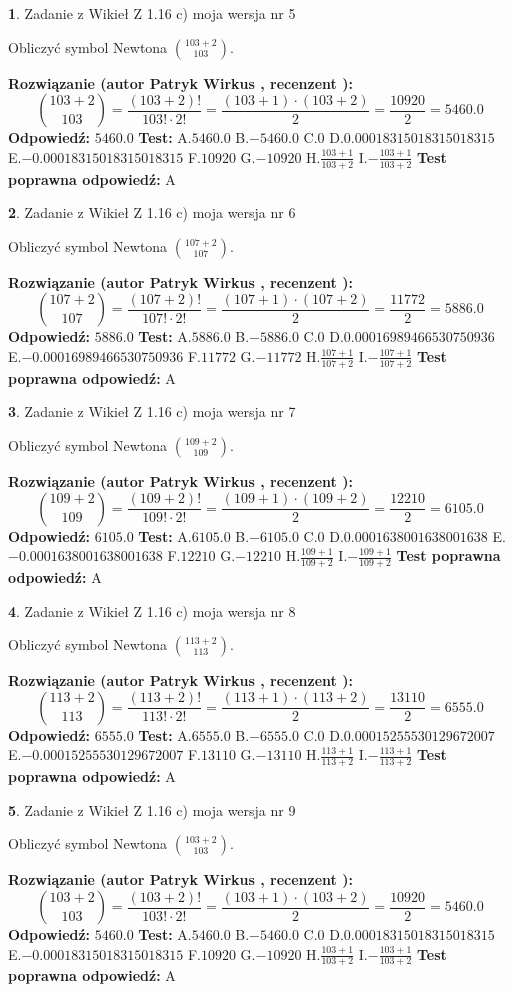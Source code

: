 \documentclass[12pt, a4paper]{article}
\theoremstyle{definition} %
\newtheorem{zad}{}
\newcommand{\zadStart}[1]{\begin{zad}#1\newline}
\newcommand{\zadStop}{\end{zad}}
\newcommand{\rozwStart}[2]{\noindent \textbf{Rozwiązanie (autor #1 , recenzent #2): }\newline}
\newcommand{\rozwStop}{\newline}
\newcommand{\odpStart}{\noindent \textbf{Odpowiedź:}\newline}
\newcommand{\odpStop}{\newline}
\newcommand{\testStart}{\noindent \textbf{Test:}\newline}
\newcommand{\testStop}{\newline}
\newcommand{\kluczStart}{\noindent \textbf{Test poprawna odpowiedź:}\newline}
\newcommand{\kluczStop}{\newline}
\begin{document}
\zadStart{Zadanie z Wikieł Z 1.16 c) moja wersja nr 5}

Obliczyć symbol Newtona ${103+2 \choose 103}$.
\zadStop
\rozwStart{Patryk Wirkus}{}
$${103+2 \choose 103} = \frac{(103+2)!}{103! \cdot 2!} = \frac{(103+1)\cdot(103+2)}{2} = \frac{10920}{2} = 5460.0$$
\rozwStop
\odpStart
$5460.0$
\odpStop
\testStart
A.$5460.0$ B.$-5460.0$ C.$0$ D.$0.00018315018315018315$ E.$-0.00018315018315018315$
F.$10920$ G.$-10920$
H.$\frac{103+1}{103+2}$
I.$-\frac{103+1}{103+2}$
\testStop
\kluczStart
A
\kluczStop



\zadStart{Zadanie z Wikieł Z 1.16 c) moja wersja nr 6}

Obliczyć symbol Newtona ${107+2 \choose 107}$.
\zadStop
\rozwStart{Patryk Wirkus}{}
$${107+2 \choose 107} = \frac{(107+2)!}{107! \cdot 2!} = \frac{(107+1)\cdot(107+2)}{2} = \frac{11772}{2} = 5886.0$$
\rozwStop
\odpStart
$5886.0$
\odpStop
\testStart
A.$5886.0$ B.$-5886.0$ C.$0$ D.$0.00016989466530750936$ E.$-0.00016989466530750936$
F.$11772$ G.$-11772$
H.$\frac{107+1}{107+2}$
I.$-\frac{107+1}{107+2}$
\testStop
\kluczStart
A
\kluczStop



\zadStart{Zadanie z Wikieł Z 1.16 c) moja wersja nr 7}

Obliczyć symbol Newtona ${109+2 \choose 109}$.
\zadStop
\rozwStart{Patryk Wirkus}{}
$${109+2 \choose 109} = \frac{(109+2)!}{109! \cdot 2!} = \frac{(109+1)\cdot(109+2)}{2} = \frac{12210}{2} = 6105.0$$
\rozwStop
\odpStart
$6105.0$
\odpStop
\testStart
A.$6105.0$ B.$-6105.0$ C.$0$ D.$0.0001638001638001638$ E.$-0.0001638001638001638$
F.$12210$ G.$-12210$
H.$\frac{109+1}{109+2}$
I.$-\frac{109+1}{109+2}$
\testStop
\kluczStart
A
\kluczStop



\zadStart{Zadanie z Wikieł Z 1.16 c) moja wersja nr 8}

Obliczyć symbol Newtona ${113+2 \choose 113}$.
\zadStop
\rozwStart{Patryk Wirkus}{}
$${113+2 \choose 113} = \frac{(113+2)!}{113! \cdot 2!} = \frac{(113+1)\cdot(113+2)}{2} = \frac{13110}{2} = 6555.0$$
\rozwStop
\odpStart
$6555.0$
\odpStop
\testStart
A.$6555.0$ B.$-6555.0$ C.$0$ D.$0.00015255530129672007$ E.$-0.00015255530129672007$
F.$13110$ G.$-13110$
H.$\frac{113+1}{113+2}$
I.$-\frac{113+1}{113+2}$
\testStop
\kluczStart
A
\kluczStop



\zadStart{Zadanie z Wikieł Z 1.16 c) moja wersja nr 9}

Obliczyć symbol Newtona ${103+2 \choose 103}$.
\zadStop
\rozwStart{Patryk Wirkus}{}
$${103+2 \choose 103} = \frac{(103+2)!}{103! \cdot 2!} = \frac{(103+1)\cdot(103+2)}{2} = \frac{10920}{2} = 5460.0$$
\rozwStop
\odpStart
$5460.0$
\odpStop
\testStart
A.$5460.0$ B.$-5460.0$ C.$0$ D.$0.00018315018315018315$ E.$-0.00018315018315018315$
F.$10920$ G.$-10920$
H.$\frac{103+1}{103+2}$
I.$-\frac{103+1}{103+2}$
\testStop
\kluczStart
A
\kluczStop
\end{document}

